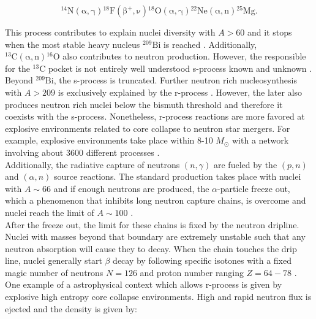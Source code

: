 \documentclass[openany]{book}
\begin{document}
\begin{equation}\label{eq:reaction_sprocess_source}
	\mathrm{{}^{14}N(\alpha, \gamma) {}^{18}F(\beta^+, \nu) {}^{18}O(\alpha, \gamma) {}^{22}Ne(\alpha, n) {}^{25}Mg}.
\end{equation}

This process contributes to explain nuclei diversity with $A > 60$ \cite{kappeler_2005} and it stops when the most stable heavy nucleus $\mathrm{{}^{209}Bi}$ is reached \cite{iliadis_2015}. Additionally, $\mathrm{{}^{13}C(\alpha, n){}^{16}O}$ also contributes to neutron production. However, the responsible for the $\mathrm{{}^{13}C}$ pocket is not entirely well understood s-process known and unknown \cite{lattanzio_lugaro_2005}. \\

Beyond $\mathrm{{}^{209}Bi}$, the s-process is truncated.  Further neutron rich nucleosynthesis with $A>209$ is exclusively explained by the r-process \cite{qian_vogel_wasserburg_1999}. However, the later also produces neutron rich nuclei below the bismuth threshold and therefore it coexists with the s-process. Nonetheless, r-process reactions are more favored at explosive environments related to core collapse to neutron star mergers. For example, explosive environments take place within 8-10 $M_{\odot}$ with a network involving about 3600 different processes \cite{wanajo_tamamura_itoh_nomoto_ishimaru_beers_nozawa_2003}. \\

Additionally, the radiative capture of neutrons $(n, \gamma)$ are fueled by the $(p, n)$ and $(\alpha, n)$ source reactions. The standard production takes place with nuclei with $A \sim 66$ and if enough neutrons are produced, the $\alpha$-particle freeze out, which a phenomenon that inhibits long neutron capture chains, is overcome and nuclei reach the limit of $A \sim 100$ \cite{woosley_hoffman_1992}. \\

After the freeze out, the limit for these chains is fixed by the neutron dripline. Nuclei with masses beyond that boundary are extremely unstable such that any neutron absorption will cause they to decay. When the chain touches the drip line, nuclei generally start $\beta$ decay by following specific isotones with a fixed magic number of neutrons $N = 126$ and proton number ranging $Z=64-78$ \cite{suzuki_shibagaki_yoshida_kajino_otsuka_2018}. \\

One example of a astrophysical context which allows r-process is given by explosive high entropy core collapse environments. High and rapid neutron flux is ejected and the density is given by: 
\end{document}
